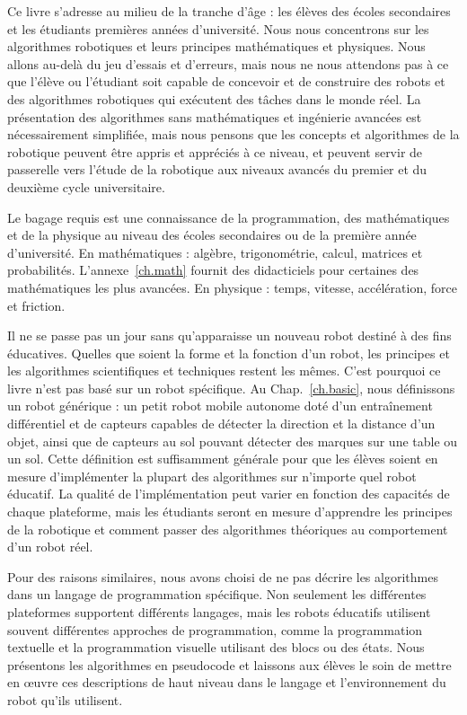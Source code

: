 Ce livre s'adresse au milieu de la tranche d'âge : les élèves des écoles secondaires et les étudiants premières années d'université. Nous nous concentrons sur les algorithmes robotiques et leurs principes mathématiques et physiques. Nous allons au-delà du jeu d'essais et d'erreurs, mais nous ne nous attendons pas à ce que l'élève ou l'étudiant soit capable de concevoir et de construire des robots et des algorithmes robotiques qui exécutent des tâches dans le monde réel. La présentation des algorithmes sans mathématiques et ingénierie avancées est nécessairement simplifiée, mais nous pensons que les concepts et algorithmes de la robotique peuvent être appris et appréciés à ce niveau, et peuvent servir de passerelle vers l'étude de la robotique aux niveaux avancés du premier et du deuxième cycle universitaire.

Le bagage requis est une connaissance de la programmation, des mathématiques et de la physique au niveau des écoles secondaires ou de la première année d'université. En mathématiques : algèbre, trigonométrie, calcul, matrices et probabilités. L'annexe~\ref{ch.math} fournit des didacticiels pour certaines des mathématiques les plus avancées. En physique : temps, vitesse, accélération, force et friction.

Il ne se passe pas un jour sans qu'apparaisse un nouveau robot destiné à des fins éducatives. Quelles que soient la forme et la fonction d'un robot, les principes et les algorithmes scientifiques et techniques restent les mêmes. C'est pourquoi ce livre n'est pas basé sur un robot spécifique. Au Chap.~\ref{ch.basic}, nous définissons un robot générique : un petit robot mobile autonome doté d'un entraînement différentiel et de capteurs capables de détecter la direction et la distance d'un objet, ainsi que de capteurs au sol pouvant détecter des marques sur une table ou un sol. Cette définition est suffisamment générale pour que les élèves soient en mesure d'implémenter la plupart des algorithmes sur n'importe quel robot éducatif. La qualité de l'implémentation peut varier en fonction des capacités de chaque plateforme, mais les étudiants seront en mesure d'apprendre les principes de la robotique et comment passer des algorithmes théoriques au comportement d'un robot réel.

Pour des raisons similaires, nous avons choisi de ne pas décrire les algorithmes dans un langage de programmation spécifique. Non seulement les différentes plateformes supportent différents langages, mais les robots éducatifs utilisent souvent différentes approches de programmation, comme la programmation textuelle et la programmation visuelle utilisant des blocs ou des états. Nous présentons les algorithmes en pseudocode et laissons aux élèves le soin de mettre en œuvre ces descriptions de haut niveau dans le langage et l'environnement du robot qu'ils utilisent.

